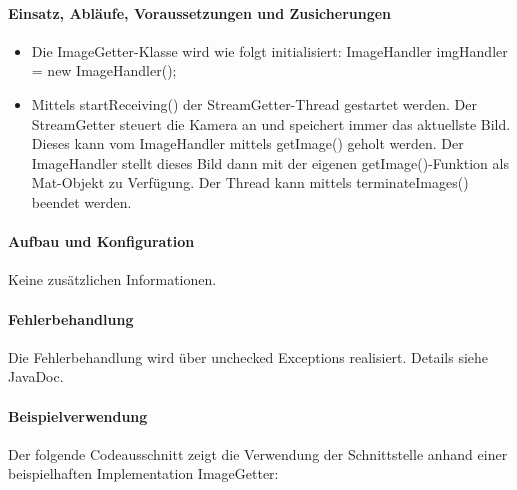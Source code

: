 \paragraph{Einsatz, Abläufe, Voraussetzungen und Zusicherungen}
\begin{itemize}
	\item{Die ImageGetter-Klasse wird wie folgt initialisiert: ImageHandler imgHandler = new ImageHandler(); }
	\item{Mittels startReceiving() der StreamGetter-Thread gestartet werden. Der StreamGetter steuert die Kamera an und speichert immer das aktuellste Bild. Dieses kann vom ImageHandler mittels getImage() geholt werden. Der ImageHandler stellt dieses Bild dann mit der eigenen getImage()-Funktion als Mat-Objekt zu Verfügung. Der Thread kann mittels terminateImages() beendet werden.}
\end{itemize}

\paragraph{Aufbau und Konfiguration} 
Keine zusätzlichen Informationen. \\

\paragraph{Fehlerbehandlung}
Die Fehlerbehandlung wird über unchecked Exceptions realisiert. Details siehe JavaDoc. \\

\paragraph{Beispielverwendung}
Der folgende Codeausschnitt zeigt die Verwendung der Schnittstelle anhand einer beispielhaften Implementation ImageGetter: \\

